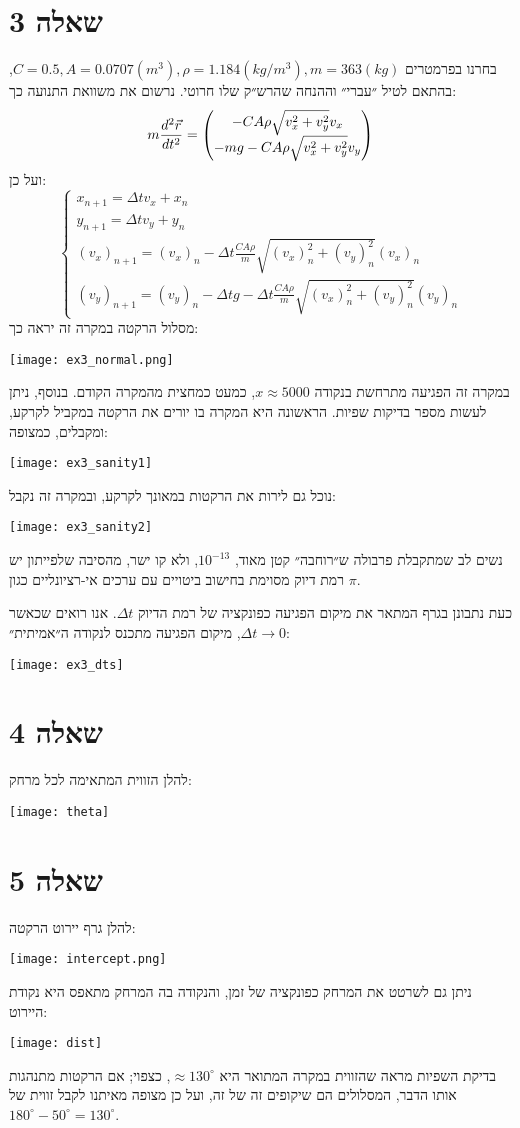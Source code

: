 \documentclass{article}
\begin{document}
	\section{שאלה 3}
	בחרנו בפרמטרים
	$C=0.5, A=0.0707(m^3), \rho=1.184(kg/m^3), m=363(kg)$,
	בהתאם לטיל ״עברי״ וההנחה שהרש״ק שלו חרוטי.
	נרשום את משוואת התנועה כך:
	\[
		m\frac{d^2\vec{r}}{dt^2}=\mqty(-CA\rho\sqrt{v_x^2+v_y^2}v_x \\ -mg-CA\rho\sqrt{v_x^2+v_y^2}v_y)
	\]
	ועל כן:
	\[
		\begin{cases}
			x_{n+1}=\Delta tv_x+x_n \\
			y_{n+1}=\Delta tv_y+y_n \\
			(v_x)_{n+1}=(v_x)_n-\Delta t\frac{CA\rho}{m}\sqrt{(v_x)_n^2+(v_y)_n^2}(v_x)_n \\
			(v_y)_{n+1}=(v_y)_n-\Delta tg-\Delta t\frac{CA\rho}{m}\sqrt{(v_x)_n^2+(v_y)_n^2}(v_y)_n
		\end{cases}
	\]
	מסלול הרקטה במקרה זה יראה כך:
	\begin{center}
		\texttt{[image: ex3\_normal.png]}
	\end{center}
	במקרה זה הפגיעה מתרחשת בנקודה
	$x\approx 5000$,
	כמעט כמחצית מהמקרה הקודם.
	בנוסף, ניתן לעשות מספר בדיקות שפיות. הראשונה היא המקרה בו יורים את הרקטה במקביל לקרקע, ומקבלים, כמצופה:
	\begin{center}
		\texttt{[image: ex3\_sanity1]}
	\end{center}
	נוכל גם לירות את הרקטות במאונך לקרקע, ובמקרה זה נקבל:
	\begin{center}
		\texttt{[image: ex3\_sanity2]}
	\end{center}
	נשים לב שמתקבלת פרבולה ש״רוחבה״ קטן מאוד, $10^{-13}$, ולא קו ישר, מהסיבה שלפייתון יש רמת דיוק מסוימת בחישוב ביטויים עם ערכים אי-רציונליים כגון
	$\pi$.
	
	כעת נתבונן בגרף המתאר את מיקום הפגיעה כפונקציה של רמת הדיוק
	$\Delta t$.
	אנו רואים שכאשר
	$\Delta t\to 0$,
	מיקום הפגיעה מתכנס לנקודה ה״אמיתית״:
	\begin{center}
		\texttt{[image: ex3\_dts]}
	\end{center}
	\section{שאלה 4}
	להלן הזווית המתאימה לכל מרחק:
	\begin{center}
		\texttt{[image: theta]}
	\end{center}
	\section{שאלה 5}
	להלן גרף יירוט הרקטה:
	\begin{center}
		\texttt{[image: intercept.png]}
	\end{center}
	ניתן גם לשרטט את המרחק כפונקציה של זמן, והנקודה בה המרחק מתאפס היא נקודת היירוט:
	\begin{center}
		\texttt{[image: dist]}
	\end{center}
	בדיקת השפיות מראה שהזווית במקרה המתואר היא
	$\approx130^\circ$,
	כצפוי; אם הרקטות מתנהגות אותו הדבר, המסלולים הם שיקופים זה של זה, ועל כן מצופה מאיתנו לקבל זווית של
	$180^\circ-50^\circ=130^\circ$.
\end{document}
